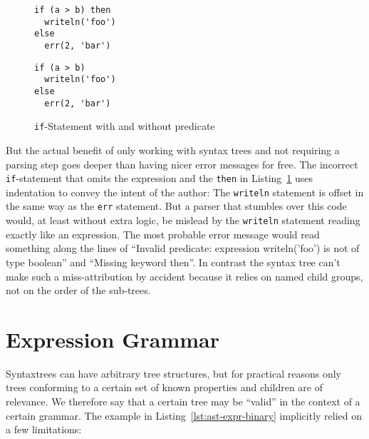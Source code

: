 \documentclass[sigconf,natbib=false]{acmart}
\newcommand{\enquote}[1]{``#1''}
\begin{document}
\begin{figure}[H]
\begin{minipage}{.20\textwidth}
\begin{lstlisting}
if (a > b) then
  writeln('foo')
else
  err(2, 'bar')
\end{lstlisting}
\end{minipage}
\begin{minipage}{.20\textwidth}
\begin{lstlisting}
if (a > b)
  writeln('foo')
else
  err(2, 'bar')
\end{lstlisting}
\end{minipage}
\caption{\texttt{if}-Statement with and without predicate}
\label{lst:if-stmt-pred}
\end{figure}

But the actual benefit of only working with syntax trees and not requiring a parsing step goes deeper than having nicer error messages for free. The incorrect \texttt{if}-statement that omits the expression and the \texttt{then} in Listing~\ref{lst:if-stmt-pred} uses indentation to convey the intent of the author: The \texttt{writeln} statement is offset in the same way as the \texttt{err} statement. But a parser that stumbles over this code would, at least without extra logic, be mislead by the \texttt{writeln} statement reading exactly like an expression. The most probable error message would read something along the lines of \enquote{Invalid predicate: expression writeln('foo') is not of type boolean} and \enquote{Missing keyword then}. In contrast the syntax tree can't make such a miss-attribution by accident because it relies on named child groups, not on the order of the sub-trees.

\section{Expression Grammar}
\label{sec:expression-grammar}

Syntaxtrees can have arbitrary tree structures, but for practical reasons only trees conforming to a certain set of known properties and children are of relevance. We therefore say that a certain tree may be \enquote{valid} in the context of a certain grammar. The example in Listing~\ref{lst:ast-expr-binary} implicitly relied on a few limitations:
\end{document}
